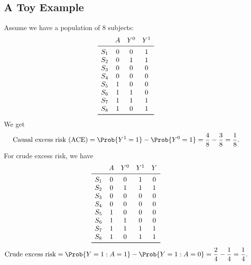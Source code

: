 \subsection*{A Toy Example}
\begin{Example}{}
    Assume we have a population of 8 subjects:
    \[ \begin{array}{cccc}
                  & A & Y^0 & Y^1 \\
            \midrule
            S_{1} & 0 & 0   & 1   \\
            S_{2} & 0 & 1   & 1   \\
            S_{3} & 0 & 0   & 0   \\
            S_{4} & 0 & 0   & 0   \\
            S_{5} & 1 & 0   & 0   \\
            S_{6} & 1 & 1   & 0   \\
            S_{7} & 1 & 1   & 1   \\
            S_{8} & 1 & 0   & 1   \\
            \bottomrule
        \end{array} \]
    We get
    \[ \text{Causal excess risk (ACE)} =\Prob{Y^1=1}-\Prob{Y^0=1}=\frac{4}{8}-\frac{3}{8}=\frac{1}{8}. \]
    For crude excess risk, we have
    \[ \begin{array}{ccccc}
                  & A & Y^0 & Y^1 & Y \\
            \midrule
            S_{1} & 0 & 0   & 1   & 0 \\
            S_{2} & 0 & 1   & 1   & 1 \\
            S_{3} & 0 & 0   & 0   & 0 \\
            S_{4} & 0 & 0   & 0   & 0 \\
            S_{5} & 1 & 0   & 0   & 0 \\
            S_{6} & 1 & 1   & 0   & 0 \\
            S_{7} & 1 & 1   & 1   & 1 \\
            S_{8} & 1 & 0   & 1   & 1 \\
            \bottomrule
        \end{array} \]
    \[ \text{Crude excess risk}=\Prob{Y=1\given A=1}-\Prob{Y=1\given A=0}=\frac{2}{4}-\frac{1}{4}=\frac{1}{4}. \]
\end{Example}
